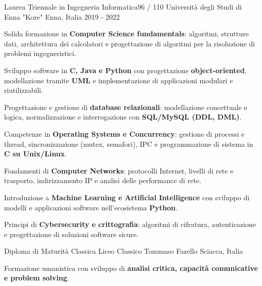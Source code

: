\begin{cventries}
  \cventry
    {Laurea Triennale in Ingegneria Informatica{\enskip\cdotp\enskip}96 / 110}
    {Università degli Studi di Enna "Kore"}
    {Enna, Italia}
    {2019 - 2022}
    {
      \begin{cvitems}
        \item {Solida formazione in \textbf{Computer Science fundamentals}: algoritmi, strutture dati, architettura dei calcolatori e progettazione di algoritmi per la risoluzione di problemi ingegneristici.}
        \item {Sviluppo software in \textbf{C, Java e Python} con progettazione \textbf{object-oriented}, modellazione tramite \textbf{UML} e implementazione di applicazioni modulari e riutilizzabili.}
        \item {Progettazione e gestione di \textbf{database relazionali}: modellazione concettuale e logica, normalizzazione e interrogazione con \textbf{SQL/MySQL (DDL, DML)}.}
        \item {Competenze in \textbf{Operating Systems e Concurrency}: gestione di processi e thread, sincronizzazione (mutex, semafori), IPC e programmazione di sistema in \textbf{C su Unix/Linux}.}
        \item {Fondamenti di \textbf{Computer Networks}: protocolli Internet, livelli di rete e trasporto, indirizzamento IP e analisi delle performance di rete.}
        \item {Introduzione a \textbf{Machine Learning e Artificial Intelligence} con sviluppo di modelli e applicazioni software nell’ecosistema \textbf{Python}.}
        \item {Principi di \textbf{Cybersecurity e crittografia}: algoritmi di cifratura, autenticazione e progettazione di soluzioni software sicure.}
        \\
      \end{cvitems}
    }
\cventry
    {Diploma di Maturità Classica}
    {Liceo Classico Tommaso Fazello}
    {Sciacca, Italia}
    {}
    {
      \begin{cvitems}
        \item {Formazione umanistica con sviluppo di \textbf{analisi critica, capacità comunicative e problem solving}.}
        \\
      \end{cvitems}
    }

\end{cventries}